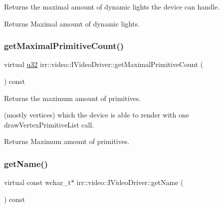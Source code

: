 Returns the maximal amount of dynamic lights the device can handle. 

\begin{DoxyReturn}{Returns}
Maximal amount of dynamic lights. 
\end{DoxyReturn}
\mbox{\label{classirr_1_1video_1_1IVideoDriver_afd93e778fac79f7863da72a50e720f88}} 
\subsubsection{\texorpdfstring{get\+Maximal\+Primitive\+Count()}{getMaximalPrimitiveCount()}}
{\footnotesize\ttfamily virtual \hyperlink{namespaceirr_a0416a53257075833e7002efd0a18e804}{u32} irr\+::video\+::\+I\+Video\+Driver\+::get\+Maximal\+Primitive\+Count (\begin{DoxyParamCaption}{ }\end{DoxyParamCaption}) const\hspace{0.3cm}{\ttfamily [pure virtual]}}



Returns the maximum amount of primitives. 

(mostly vertices) which the device is able to render with one draw\+Vertex\+Primitive\+List call. \begin{DoxyReturn}{Returns}
Maximum amount of primitives. 
\end{DoxyReturn}
\mbox{\label{classirr_1_1video_1_1IVideoDriver_a87ca51832295b2dceaa1e258daf863f1}} 
\subsubsection{\texorpdfstring{get\+Name()}{getName()}}
{\footnotesize\ttfamily virtual const wchar\+\_\+t$\ast$ irr\+::video\+::\+I\+Video\+Driver\+::get\+Name (\begin{DoxyParamCaption}{ }\end{DoxyParamCaption}) const\hspace{0.3cm}{\ttfamily [pure virtual]}}



